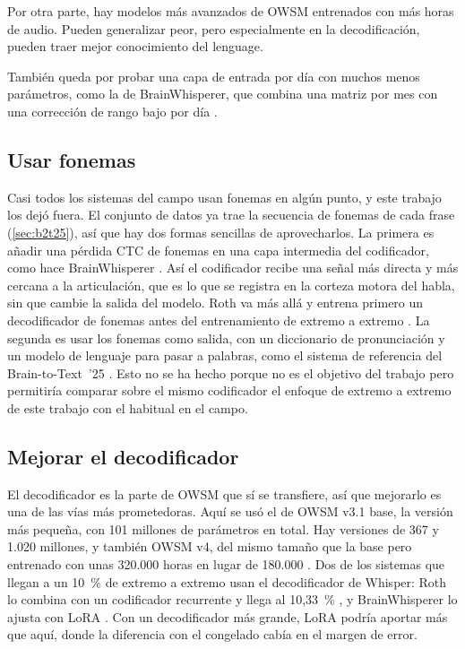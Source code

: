 Por otra parte, hay modelos más avanzados de OWSM entrenados con más horas de audio. Pueden generalizar peor, pero especialmente en la decodificación, pueden traer mejor conocimiento del lenguage.

También queda por probar una capa de entrada por día con muchos menos parámetros, como la de BrainWhisperer, que combina una matriz por mes con una corrección de rango bajo por día \cite{brainwhisperer}. 

\subsection{Usar fonemas}

Casi todos los sistemas del campo usan fonemas en algún punto, y este trabajo los dejó fuera. El conjunto de datos ya trae la secuencia de fonemas de cada frase (\cref{sec:b2t25}), así que hay dos formas sencillas de aprovecharlos. La primera es añadir una pérdida CTC de fonemas en una capa intermedia del codificador, como hace BrainWhisperer \cite{brainwhisperer}. Así el codificador recibe una señal más directa y más cercana a la articulación, que es lo que se registra en la corteza motora del habla, sin que cambie la salida del modelo. Roth va más allá y entrena primero un decodificador de fonemas antes del entrenamiento de extremo a extremo \cite{roth2026}. La segunda es usar los fonemas como salida, con un diccionario de pronunciación y un modelo de lenguaje para pasar a palabras, como el sistema de referencia del Brain-to-Text~'25 \cite{b2t25}. Esto no se ha hecho porque no es el objetivo del trabajo pero permitiría comparar sobre el mismo codificador el enfoque de extremo a extremo de este trabajo con el habitual en el campo.

\subsection{Mejorar el decodificador}

El decodificador es la parte de OWSM que sí se transfiere, así que mejorarlo es una de las vías más prometedoras. Aquí se usó el de OWSM v3.1 base, la versión más pequeña, con 101 millones de parámetros en total. Hay versiones de 367 y 1.020 millones, y también OWSM v4, del mismo tamaño que la base pero entrenado con unas 320.000 horas en lugar de 180.000 \cite{peng2025owsmv4}. Dos de los sistemas que llegan a un 10~\% de extremo a extremo usan el decodificador de Whisper: Roth lo combina con un codificador recurrente y llega al 10,33~\% \cite{roth2026}, y BrainWhisperer lo ajusta con LoRA \cite{brainwhisperer}. Con un decodificador más grande, LoRA podría aportar más que aquí, donde la diferencia con el congelado cabía en el margen de error.

